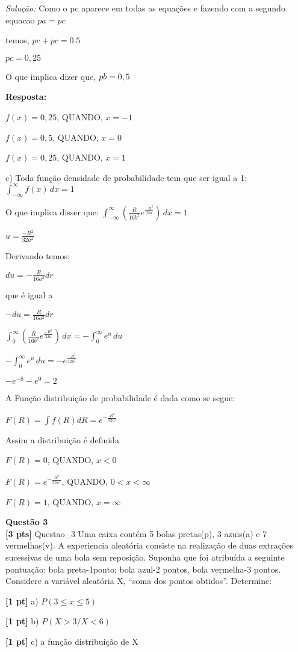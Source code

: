 \documentclass{article}
\newenvironment{problem}[2][Questão]
    { \begin{mdframed}[backgroundcolor=gray!20] \textbf{#1 #2} \\}
    {  \end{mdframed}}
\newenvironment{solution}
    {\textit{Solução:}}
    {}
\begin{document}
\begin{solution}
Como o pc aparece em todas as equações e fazendo com a segundo equacao $pa=pc$

temos, $pc + pc = 0.5$

$pc = 0,25$

O que implica dizer que, $pb = 0,5 \newline$


\textbf{Resposta:}


$f(x) = 0,25$, QUANDO, $x=-1$

$f(x) = 0,5$, QUANDO, $x=0$

$f(x) = 0,25$, QUANDO, $x=1$



\hrulefill

c) Toda função densidade de probabilidade tem que ser igual a 1: $\int_{-\infty}^{\infty} f(x) \, dx = 1$

O que implica disser que: $\int_{-\infty}^{\infty} (\frac{R}{16b^{2}} e^{\frac{-R^{2}}{32a}}) \, dx= 1$

$u = \frac{-R^{2}}{32a^{2}}$

Derivando temos: 

$du = -\frac{R}{16a^{2}} dr$

que é igual a 

$-du = \frac{R}{16a^{2}} dr$

$\int_{0}^{\infty} (\frac{R}{16b^{2}} e^{\frac{-R^{2}}{32a}}) \, dx = - \int_{0}^{\infty} e^{u} \, du$

$- \int_{0}^{\infty} e^{u} \, du = -e^{\frac{-R^{2}}{32u^{2}}}$

$-e^{-8} - e^{0} = 2$

A Função distribuição de probabilidade é dada como se segue:

$F(R) = \int f(R) dR = e^{-\frac{R^{2}}{32u^{2}}}$

Assim a distribuição é definida

$F(R) = 0$, QUANDO, $x<0$

$F(R) = e^{-\frac{R^{2}}{32u^{2}}}$, QUANDO, $0<x<\infty$

$F(R) = 1$, QUANDO, $x=\infty$

\end{solution}

\begin{problem}{3}
\textbf{[3 pts]} Questao\_3 Uma caixa contém 5 bolas pretas(p), 3 azuis(a) e 7 vermelhas(v). A experiencia aleatória 
consiste na realização de duas extrações sucessivas de uma bola sem reposição. Suponha que foi atribuída a seguinte pontuação: bola preta-1ponto; bola azul-2 pontos, bola vermelha-3 pontos. 
Considere a variável aleatória X, “soma dos pontos obtidos”. Determine:

\textbf{[1 pt]} a) $P(3 \leq x \leq 5)$ 

\textbf{[1 pt]} b) $P(X>3/X<6)$ 

\textbf{[1 pt]}  c) a função distribuição de X

\end{problem}
\end{document}
